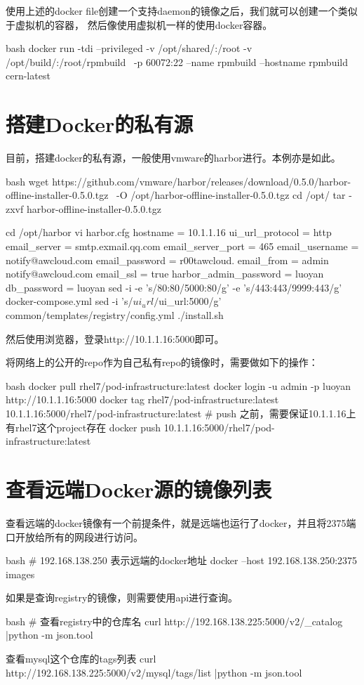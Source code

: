使用上述的docker file创建一个支持daemon的镜像之后，我们就可以创建一个类似于虚拟机的容器，
然后像使用虚拟机一样的使用docker容器。
\begin{code-block}{bash}
docker run -tdi --privileged -v /opt/shared/:/root -v /opt/build/:/root/rpmbuild \
    -p 60072:22 --name rpmbuild --hostname rpmbuild cern-latest
\end{code-block}

\section{搭建Docker的私有源}
目前，搭建docker的私有源，一般使用vmware的harbor进行。本例亦是如此。
\begin{code-block}{bash}
wget https://github.com/vmware/harbor/releases/download/0.5.0/harbor-offline-installer-0.5.0.tgz \
    -O /opt/harbor-offline-installer-0.5.0.tgz
cd /opt/
tar -zxvf harbor-offline-installer-0.5.0.tgz

cd /opt/harbor
vi harbor.cfg
hostname = 10.1.1.16
ui_url_protocol = http
email_server = smtp.exmail.qq.com
email_server_port = 465
email_username = notify@awcloud.com
email_password = r00tawcloud.
email_from = admin notify@awcloud.com
email_ssl = true
harbor_admin_password = luoyan
db_password = luoyan
sed -i -e 's/80:80/5000:80/g' -e 's/443:443/9999:443/g' docker-compose.yml
sed -i 's/$ui_url/$ui_url:5000/g' common/templates/registry/config.yml
./install.sh
\end{code-block}

然后使用浏览器，登录http://10.1.1.16:5000即可。

将网络上的公开的repo作为自己私有repo的镜像时，需要做如下的操作：
\begin{code-block}{bash}
docker pull rhel7/pod-infrastructure:latest
docker login -u admin -p luoyan http://10.1.1.16:5000
docker tag rhel7/pod-infrastructure:latest 10.1.1.16:5000/rhel7/pod-infrastructure:latest
# push 之前，需要保证10.1.1.16上有rhel7这个project存在
docker push 10.1.1.16:5000/rhel7/pod-infrastructure:latest
\end{code-block}

\section{查看远端Docker源的镜像列表}
查看远端的docker镜像有一个前提条件，就是远端也运行了docker，并且将2375端口开放给所有的网段进行访问。
\begin{code-block}{bash}
# 192.168.138.250 表示远端的docker地址
docker --host 192.168.138.250:2375 images
\end{code-block}

如果是查询registry的镜像，则需要使用api进行查询。
\begin{code-block}{bash}
# 查看registry中的仓库名
curl http://192.168.138.225:5000/v2/_catalog |python -m json.tool

查看mysql这个仓库的tags列表
curl http://192.168.138.225:5000/v2/mysql/tags/list |python -m json.tool
\end{code-block}

